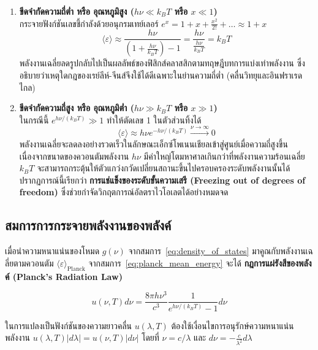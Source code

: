 \begin{enumerate}
    \item \textbf{ขีดจำกัดความถี่ต่ำ หรือ อุณหภูมิสูง ($h\nu \ll k_B T$ หรือ $x \ll 1$)} \\
    กระจายฟังก์ชันเลขชี้กำลังด้วยอนุกรมเทย์เลอร์ $e^x = 1 + x + \frac{x^2}{2!} + \dots \approx 1 + x$
    \begin{equation}
    \langle \varepsilon \rangle \approx \frac{h\nu}{(1 + \frac{h\nu}{k_B T}) - 1} = \frac{h\nu}{\frac{h\nu}{k_B T}} = k_B T
    \end{equation}
    พลังงานเฉลี่ยลดรูปกลับไปเป็นผลลัพธ์ของฟิสิกส์คลาสสิกตามทฤษฎีบทการแบ่งเท่าพลังงาน ซึ่งอธิบายว่าเหตุใดกฎของเรย์ลีห์-จีนส์จึงใช้ได้ดีเฉพาะในย่านความถี่ต่ำ (คลื่นวิทยุและอินฟราเรดไกล)
    
    \item \textbf{ขีดจำกัดความถี่สูง หรือ อุณหภูมิต่ำ ($h\nu \gg k_B T$ หรือ $x \gg 1$)} \\
    ในกรณีนี้ $e^{h\nu/(k_B T)} \gg 1$ ทำให้ตัดเลข 1 ในตัวส่วนทิ้งได้
    \begin{equation}
    \langle \varepsilon \rangle \approx h\nu e^{-h\nu / (k_B T)} \xrightarrow{\nu \to \infty} 0
    \end{equation}
    พลังงานเฉลี่ยจะลดลงอย่างรวดเร็วในลักษณะเอ็กซ์โพเนนเชียลเข้าสู่ศูนย์เมื่อความถี่สูงขึ้น เนื่องจากขนาดของควอนตัมพลังงาน $h\nu$ มีค่าใหญ่โตมหาศาลเกินกว่าที่พลังงานความร้อนเฉลี่ย $k_B T$ จะสามารถกระตุ้นให้ตัวแกว่งกวัดเปลี่ยนสถานะขึ้นไปครอบครองระดับพลังงานนั้นได้ ปรากฏการณ์นี้เรียกว่า \textbf{การแช่แข็งของระดับขั้นความเสรี (Freezing out of degrees of freedom)} ซึ่งช่วยกำจัดวิกฤตการณ์อัลตราไวโอเลตได้อย่างหมดจด
\end{enumerate}

\subsection{สมการการกระจายพลังงานของพลังค์}

เมื่อนำความหนาแน่นของโหมด $g(\nu)$ จากสมการ~\eqref{eq:density_of_states} มาคูณกับพลังงานเฉลี่ยตามควอนตัม $\langle \varepsilon \rangle_{\text{Planck}}$ จากสมการ~\eqref{eq:planck_mean_energy} จะได้ \textbf{กฎการแผ่รังสีของพลังค์ (Planck's Radiation Law)}

\begin{equation}
u(\nu, T) d\nu = \frac{8\pi h\nu^3}{c^3} \frac{1}{e^{h\nu/(k_B T)} - 1} d\nu
\label{eq:planck_spectrum_nu}
\end{equation}

ในการแปลงเป็นฟังก์ชันของความยาวคลื่น $u(\lambda, T)$ ต้องใช้เงื่อนไขการอนุรักษ์ความหนาแน่นพลังงาน $u(\lambda, T)|d\lambda| = u(\nu, T)|d\nu|$ โดยที่ $\nu = c/\lambda$ และ $d\nu = -\frac{c}{\lambda^2}d\lambda$

